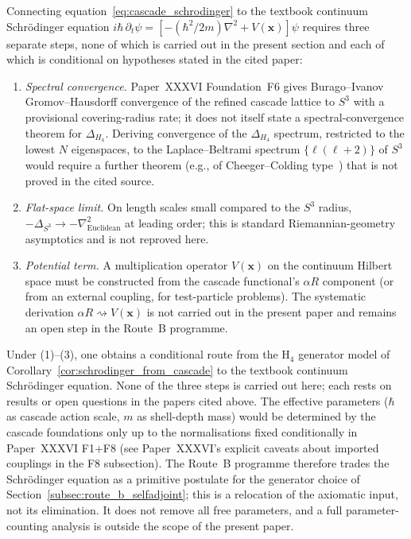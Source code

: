 \documentclass[12pt]{article}
\begin{document}
Connecting equation~\eqref{eq:cascade_schrodinger} to the textbook continuum Schr\"odinger equation $i\hbar\,\partial_t\psi = [-(\hbar^2/2m)\nabla^2 + V(\mathbf{x})]\psi$ requires three separate steps, none of which is carried out in the present section and each of which is conditional on hypotheses stated in the cited paper:

\begin{enumerate}
    \item \emph{Spectral convergence.} Paper~XXXVI Foundation~F6 gives Burago--Ivanov Gromov--Hausdorff convergence of the refined cascade lattice to $S^3$ with a provisional covering-radius rate; it does not itself state a spectral-convergence theorem for $\Delta_{H_4}$. Deriving convergence of the $\Delta_{H_4}$ spectrum, restricted to the lowest $N$ eigenspaces, to the Laplace--Beltrami spectrum $\{\ell(\ell+2)\}$ of $S^3$ would require a further theorem (e.g., of Cheeger--Colding type~\citep{CheegerColding1997}) that is not proved in the cited source.
    \item \emph{Flat-space limit.} On length scales small compared to the $S^3$ radius, $-\Delta_{S^3} \to -\nabla^2_{\text{Euclidean}}$ at leading order; this is standard Riemannian-geometry asymptotics and is not reproved here.
    \item \emph{Potential term.} A multiplication operator $V(\mathbf{x})$ on the continuum Hilbert space must be constructed from the cascade functional's $\alpha R$ component (or from an external coupling, for test-particle problems). The systematic derivation $\alpha R \rightsquigarrow V(\mathbf{x})$ is not carried out in the present paper and remains an open step in the Route~B programme.
\end{enumerate}

Under (1)--(3), one obtains a conditional route from the H${}_4$ generator model of Corollary~\ref{cor:schrodinger_from_cascade} to the textbook continuum Schr\"odinger equation. None of the three steps is carried out here; each rests on results or open questions in the papers cited above. The effective parameters ($\hbar$ as cascade action scale, $m$ as shell-depth mass) would be determined by the cascade foundations only up to the normalisations fixed conditionally in Paper~XXXVI F1+F8 (see Paper~XXXVI's explicit caveats about imported couplings in the F8 subsection). The Route~B programme therefore trades the Schr\"odinger equation as a primitive postulate for the generator choice of Section~\ref{subsec:route_b_selfadjoint}; this is a relocation of the axiomatic input, not its elimination. It does not remove all free parameters, and a full parameter-counting analysis is outside the scope of the present paper.
\end{document}
